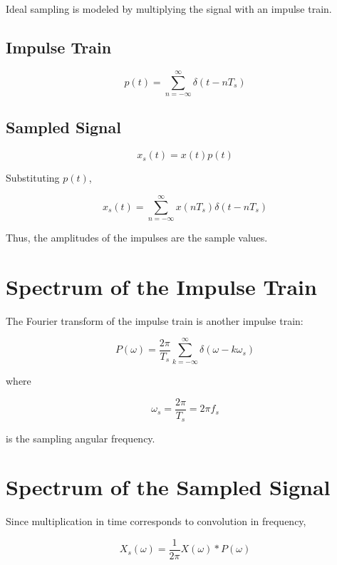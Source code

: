 Ideal sampling is modeled by multiplying the signal with an impulse train.


\subsection{Impulse Train}

\[
\boxed{
p(t)=\sum_{n=-\infty}^{\infty}\delta(t-nT_s)
}
\]


\subsection{Sampled Signal}

\[
x_s(t)=x(t)p(t)
\]

Substituting \(p(t)\),

\[
\boxed{
x_s(t)=
\sum_{n=-\infty}^{\infty}
x(nT_s)\delta(t-nT_s)
}
\]

Thus, the amplitudes of the impulses are the sample values.


\section{Spectrum of the Impulse Train}

The Fourier transform of the impulse train is another impulse train:

\[
\boxed{
P(\omega)=
\frac{2\pi}{T_s}
\sum_{k=-\infty}^{\infty}
\delta(\omega-k\omega_s)
}
\]

where

\[
\boxed{
\omega_s=\frac{2\pi}{T_s}=2\pi f_s
}
\]

is the sampling angular frequency.


\section{Spectrum of the Sampled Signal}

Since multiplication in time corresponds to convolution in frequency,

\[
X_s(\omega)=
\frac{1}{2\pi}
X(\omega)*P(\omega)
\]

